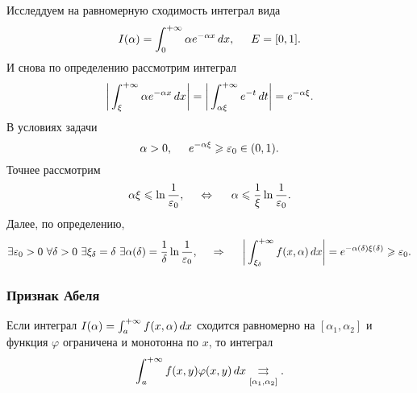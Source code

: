 Исследдуем на равномерную сходимость интеграл вида
\begin{equation*}
    I(\alpha) = \int_{0}^{+\infty} \alpha e^{- \alpha x} \d x, \hspace{5 mm} E = [0, 1].
\end{equation*}
И снова по определению рассмотрим интеграл 
\begin{equation*}
    \bigg|
        \int_\xi^{+\infty} \alpha e^{-\alpha x} \d x 
    \bigg| 
    = 
    \bigg|
        \int_{\alpha \xi}^{+\infty} e^{-t} \d t
    \bigg| = e^{- \alpha \xi}.
\end{equation*}
В условиях задачи
\begin{equation*}
    \alpha > 0, \hspace{5 mm}
    e^{-\alpha \xi} \geq \varepsilon_0 \in (0, 1).
\end{equation*}
Точнее рассмотрим
\begin{equation*}
    \alpha \xi \leq \ln \frac{1}{\varepsilon_0},
    \hspace{0.5cm} \Leftrightarrow \hspace{0.5cm}
    \alpha \leq \frac{1}{\xi} \ln \frac{1}{\varepsilon_0}.
\end{equation*}
Далее, по определению,
\begin{equation*}
    \exists \varepsilon_0 > 0 \ \forall \delta > 0 \ \exists \xi_\delta = \delta
    \ \exists \alpha(\delta) = \frac{1}{\delta} \ln \frac{1}{\varepsilon_0},
    \hspace{0.5cm} \Rightarrow \hspace{0.5cm}
    \bigg|
        \int_{\xi_\delta}^{+\infty} f(x, \alpha) \d x 
    \bigg| = e^{- \alpha(\delta) \xi(\delta)} \geq \varepsilon_0.
\end{equation*}





\subsubsection*{Признак Абеля}

\begin{to_lem}
    Если интеграл $I(\alpha) = \int_a^{+\infty} f(x, \alpha) \d x$  сходится равномерно на $[\alpha_1, \alpha_2]$ и функция $\varphi$ ограничена и монотонна по $x$, то интеграл 
    \begin{equation*}
        \int_a^{+\infty} f(x, y) \varphi(x, y) \d x 
        \underset{[\alpha_1, \alpha_2]}{\rightrightarrows}.
    \end{equation*}
\end{to_lem}

